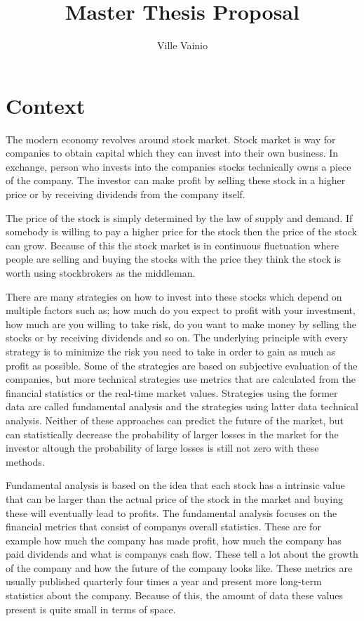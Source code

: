 \documentclass[article,11pt]{article}
\title{Master Thesis Proposal}
\begin{document}
\author{Ville Vainio}
\maketitle

\section{Context}

The modern economy revolves around stock market. Stock market is way for companies to obtain capital which they can invest into their own business. In exchange, person who invests into the companies stocks technically owns a piece of the company. The investor can make profit by selling these stock in a higher price or by receiving dividends from the company itself.

The price of the stock is simply determined by the law of supply and demand. If somebody is willing to pay a higher price for the stock then the price of the stock can grow. Because of this the stock market is in continuous fluctuation where people are selling and buying the stocks with the price they think the stock is worth using stockbrokers as the middleman. \cite{person}

There are many strategies on how to invest into these stocks which depend on multiple factors such as; how much do you expect to profit with your investment, how much are you willing to take risk, do you want to make money by selling the stocks or by receiving dividends and so on. The underlying principle with every strategy is to minimize the risk you need to take in order to gain as much as profit as possible. Some of the strategies are based on subjective evaluation of the companies, but more technical strategies use metrics that are calculated from the financial statistics or the real-time market values. Strategies using the former data are called fundamental analysis and the strategies using latter data technical analysis. Neither of these approaches can predict the future of the market, but can statistically decrease the probability of larger losses in the market for the investor altough the probability of large losses is still not zero with these methods. \cite{fox}

Fundamental analysis is based on the idea that each stock has a intrinsic value that can be larger than the actual price of the stock in the market and buying these will eventually lead to profits.\cite{sohnke} The fundamental analysis focuses on the financial metrics that consist of companys overall statistics. These are for example how much the company has made profit, how much the company has paid dividends and what is companys cash flow. These tell a lot about the growth of the company and how the future of the company looks like. These metrics are usually published quarterly four times a year and present more long-term statistics about the company. Because of this, the amount of data these values present is quite small in terms of space.
\end{document}
